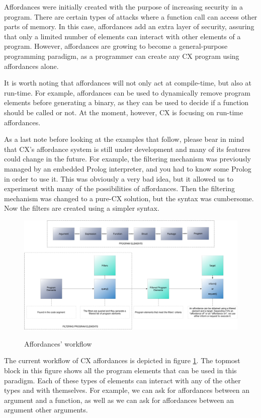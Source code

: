 \documentclass[11pt,fleqn,openany]{book} %
\begin{document}
Affordances were initially created with the purpose of increasing security in a program. There are certain types of attacks where a function call can access other parts of memory. In this case, affordances add an extra layer of security, assuring that only a limited number of elements can interact with other elements of a program. However, affordances are growing to become a general-purpose programming paradigm, as a programmer can create any CX program using affordances alone.

It is worth noting that affordances will not only act at compile-time, but also at run-time. For example, affordances can be used to dynamically remove program elements before generating a binary, as they can be used to decide if a function should be called or not. At the moment, however, CX is focusing on run-time affordances.

As a last note before looking at the examples that follow, please bear in mind that CX's affordance system is still under development and many of its features could change in the future. For example, the filtering mechanism was previously managed by an embedded Prolog interpreter, and you had to know some Prolog in order to use it. This was obviously a very bad idea, but it allowed us to experiment with many of the possibilities of affordances. Then the filtering mechanism was changed to a pure-CX solution, but the syntax was cumbersome. Now the filters are created using a simpler syntax.

\begin{figure}
\caption{Affordances' workflow}
\centering
\includegraphics[width=1.0\textwidth]{img/affordances.png}
\label{figure:affordances-workflow}
\end{figure}

The current workflow of CX affordances is depicted in figure \ref{figure:affordances-workflow}. The topmost block in this figure shows all the program elements that can be used in this paradigm. Each of these types of elements can interact with any of the other types and with themselves. For example, we can ask for affordances between an argument and a function, as well as we can ask for affordances between an argument other arguments.
\end{document}

